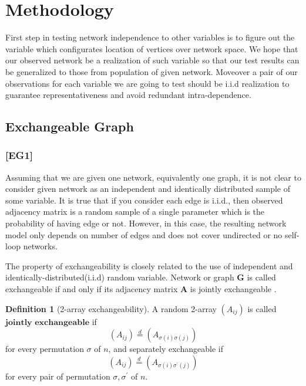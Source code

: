 \documentclass[12pt]{article}
\theoremstyle{definition}
\newtheorem{definition}{Definition}[section]
\begin{document}
 
  
\newpage
\section{Methodology}
\label{sec:method}

First step in testing network independence to other variables is to figure out the variable which configurates location of vertices over network space.  We hope that our observed network be a realization of such variable so that our test results can be generalized to those from population of given network. Moveover a pair of our observations for each variable we are going to test should be i.i.d realization to guarantee representativeness and avoid redundant intra-dependence.  

\subsection{Exchangeable Graph}

\subsubsection{[EG1]}


Assuming that we are given one network, equivalently one graph, it is not clear to consider given network as an independent and identically distributed sample of some variable. It is true that if you consider each edge is i.i.d., then observed adjacency matrix is a random sample of  a single parameter which is the probability of having edge or not. However, in this case, the resulting network model only depends on number of edges \cite{Orbanz} and does not cover undirected or no self-loop networks.  

 The property of exchangeability is closely related to the use of independent and identically-distributed(i.i.d) random variable. Network or graph $\mathbf{G}$ is called exchangeable if and only if its adjacency matrix $\mathbf{A}$ is jointly exchangeable \cite{Orbanz}. 

\begin{definition}[2-array exchangeability]
	\label{exchangeability}
	A random 2-array $(A_{ij})$ is called $\mathbf{\mbox{jointly exchangeable}}$ if 
	$$(A_{ij}) \stackrel{d}{=} (A_{\sigma(i) \sigma(j)})$$
	for every permutation $\sigma$ of $n$,
	and separately exchangeable if 
	$$(A_{ij}) \stackrel{d}{=} (A_{\sigma(i) \sigma^{\prime}(j) })$$
	for every pair of permutation $\sigma, \sigma^{\prime}$ of $n$.
\end{definition}
\end{document}
